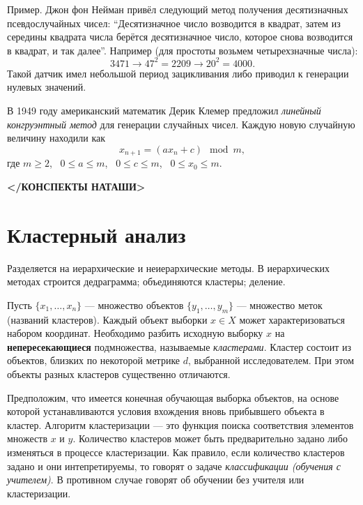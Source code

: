 \documentclass[12pt]{article}
\begin{document}
Пример. Джон фон Нейман привёл следующий метод получения десятизначных псевдослучайных чисел: \enquote{Десятизначное число возводится в квадрат, затем из середины квадрата числа берётся десятизначное число, которое снова возводится в квадрат, и так далее}. Например (для простоты возьмем четырехзначные числа):
\[ 3471 \to 47^2 = 2209 \to 20^2 = 4000.\]
Такой датчик имел небольшой период зацикливания либо приводил к генерации нулевых значений.

В 1949 году американский математик Дерик Клемер предложил \emph{линейный конгруэнтный метод} для генерации случайных чисел. Каждую новую случайную величину находили как 
\[x_{n+1} = (a x_n + c) \mod m, \]
где $m \geq 2$,~ $0 \leq a \leq m$, ~$0 \leq c \leq m$,~ $0 \leq x_0 \leq m$.

\newpage
\null
\vfill
\begin{center}
\textbf{</КОНСПЕКТЫ НАТАШИ>}
\end{center}
\vfill
\newpage

\newpage
\section{Кластерный анализ}
Разделяется на иерархические и неиерархические методы. В иерархических методах строится дедраграмма; объединяются кластеры; деление.

Пусть $\{ x_1, \ldots, x_n \}$ --- множество объектов $\{ y_1, \ldots, y_m \}$ --- множество меток (названий кластеров). Каждый объект выборки $x \in X$ может характеризоваться набором координат. Необходимо разбить исходную выборку $x$ на \textbf{непересекающиеся} подмножества, называемые \emph{кластерами}. Кластер состоит из объектов, близких по некоторой метрике $d$, выбранной исследователем. При этом объекты разных кластеров существенно отличаются.

Предположим, что имеется конечная обучающая выборка объектов, на основе которой устанавливаются условия вхождения вновь прибывшего объекта в кластер. Алгоритм кластеризации --- это функция поиска соответствия элементов множеств $x$ и $y$. Количество кластеров может быть предварительно задано либо изменяться в процессе кластеризации. Как правило, если количество кластеров задано и они интепретируемы, то говорят о задаче \emph{классификации (обучения с учителем)}. В противном случае говорят об обучении без учителя или кластеризации.\\
\end{document}

